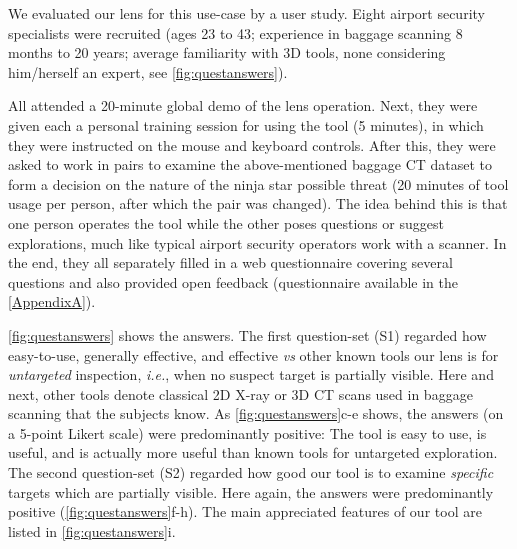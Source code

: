 We evaluated our lens for this use-case by a user study. Eight airport security specialists were recruited (ages 23 to 43; experience in baggage scanning 8 months to 20 years; average familiarity with 3D tools, none considering him/herself an expert, see \autoref{fig:questanswers}).


All attended a 20-minute global demo of the lens operation. Next, they were given each a personal training session for using the tool (5 minutes), in which they were instructed on the mouse and keyboard controls. After this, they were asked to work in pairs to examine the above-mentioned baggage CT dataset to form a decision on the nature of the ninja star possible threat (20 minutes of tool usage per person, after which the pair was changed). The idea behind this is that one person operates the tool while the other poses questions or suggest explorations, much like typical airport security operators work with a scanner. In the end, they all separately filled in a web questionnaire covering several questions and also provided open feedback (questionnaire available in the \autoref{AppendixA}). 

\autoref{fig:questanswers} shows the answers. The first question-set (S1) regarded how easy-to-use, generally effective, and effective \emph{vs} other known tools our lens is for \emph{untargeted} inspection, \emph{i.e.}, when no suspect target is partially visible. Here and next, other tools denote classical 2D X-ray or 3D CT scans used in baggage scanning that the subjects know. As \autoref{fig:questanswers}c-e shows, 
the answers (on a 5-point Likert scale) were predominantly positive: The tool is easy to use, is useful, and is actually more useful than known tools for untargeted exploration. The second question-set (S2) regarded how good our tool is to examine \emph{specific} targets which are partially visible. Here again, the answers were predominantly positive (\autoref{fig:questanswers}f-h). The main appreciated features of our tool are listed in \autoref{fig:questanswers}i.



